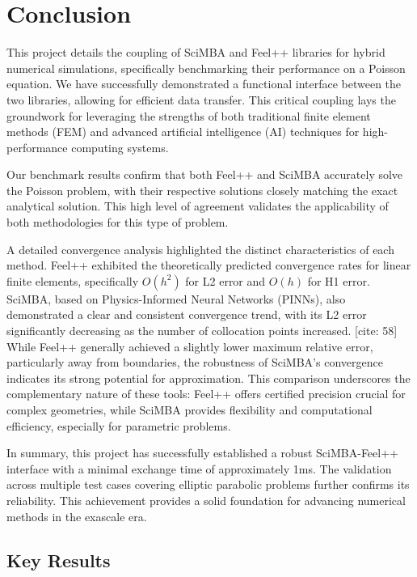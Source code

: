 \documentclass[12pt]{article}
\begin{document}
\section{Conclusion}

This project details the coupling of SciMBA and Feel++ libraries for hybrid numerical simulations, specifically benchmarking their performance on a Poisson equation.  We have successfully demonstrated a functional interface between the two libraries, allowing for efficient data transfer.  This critical coupling lays the groundwork for leveraging the strengths of both traditional finite element methods (FEM) and advanced artificial intelligence (AI) techniques for high-performance computing systems. 

Our benchmark results confirm that both Feel++ and SciMBA accurately solve the Poisson problem, with their respective solutions closely matching the exact analytical solution.  This high level of agreement validates the applicability of both methodologies for this type of problem. 

A detailed convergence analysis highlighted the distinct characteristics of each method.  Feel++ exhibited the theoretically predicted convergence rates for linear finite elements, specifically $O(h^2)$ for L2 error and $O(h)$ for H1 error.  SciMBA, based on Physics-Informed Neural Networks (PINNs), also demonstrated a clear and consistent convergence trend, with its L2 error significantly decreasing as the number of collocation points increased. [cite: 58] While Feel++ generally achieved a slightly lower maximum relative error, particularly away from boundaries, the robustness of SciMBA's convergence indicates its strong potential for approximation.  This comparison underscores the complementary nature of these tools: Feel++ offers certified precision crucial for complex geometries, while SciMBA provides flexibility and computational efficiency, especially for parametric problems. 

In summary, this project has successfully established a robust SciMBA-Feel++ interface with a minimal exchange time of approximately 1ms.  The validation across multiple test cases covering elliptic parabolic problems further confirms its reliability.  This achievement provides a solid foundation for advancing numerical methods in the exascale era. 

\subsection{Key Results}
\end{document}
